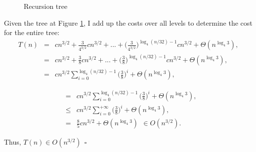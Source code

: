 \documentclass{article}
\begin{document}
\begin{figure}[h]
\begin{center}
	\caption{Recursion tree} \label{recursion_tree}
	\end{center}
	
	\end{figure}
	
	\noindent Given the tree at Figure \ref{recursion_tree}, I add up the costs over all levels to determine the cost for the entire tree:
	\begin{eqnarray}
	\nonumber
	T(n) &=& cn^{3/2} + \frac{3}{4^{3/2}} cn^{3/2} + ... + \Bigg( \frac{3}{4^{3/2}} \Bigg)^{\log_4 (n/32)-1} cn^{3/2} + \Theta(n^{\log_4 3}),\\
	\nonumber
	&=& cn^{3/2} + \frac{3}{8} cn^{3/2} + ... + \Bigg( \frac{3}{8} \Bigg)^{\log_4 (n/32)-1} cn^{3/2} + \Theta(n^{\log_4 3}), \\ 
	\nonumber
	&=& cn^{3/2} \sum_{i=0}^{\log_4 (n/32)-1} \Bigg( \frac{3}{8} \Bigg)^i + \Theta(n^{\log_4 3}), 
	\nonumber
	\end{eqnarray}
	
	\begin{eqnarray}
	\nonumber
	&=& cn^{3/2} \sum_{i=0}^{\log_4 (n/32)-1} \Bigg( \frac{3}{8} \Bigg)^i + \Theta(n^{\log_4 3}), \\
	\nonumber
	&\leq &   cn^{3/2} \sum_{i=0}^{+\infty} \Bigg( \frac{3}{8} \Bigg)^i + \Theta(n^{\log_4 3}), \\
	\nonumber
	 & = &   \frac{8}{5} cn^{3/2} + \Theta(n^{\log_4 3}) ~ ~ \in O(n^{3/2}) .
	\end{eqnarray}
	
	Thus, $ T(n) \in O(n^{3/2}) ~~ \square$ 
	
\end{document}

